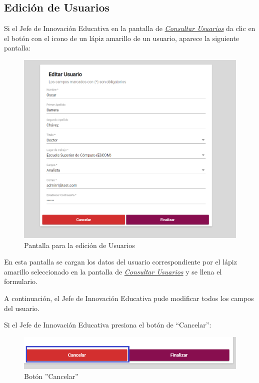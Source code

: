 \newpage

\hypertarget{editar-user}{}
\subsection{Edición de Usuarios}
Si el Jefe de Innovación Educativa en la pantalla de \hyperlink{consultarUs}{\textit{Consultar Usuarios}} da clic en el botón con el icono de un lápiz amarillo de un usuario, aparece la siguiente pantalla:

\begin{figure}[H]
	\centering
	\hypertarget{editarUs}{\includegraphics[width=0.6\linewidth]{images/SP5/Editar-Usuario}}
	\caption{Pantalla para la edición de Usuarios}
	\label{editarrh}
\end{figure}

En esta pantalla se cargan los datos del usuario correspondiente por el lápiz amarillo seleccionado en la pantalla de \hyperlink{consultarUs}{\textit{Consultar Usuarios}} y se llena el formulario.

A continuación, el Jefe de Innovación Educativa pude modificar todos los campos del usuario.

Si el Jefe de Innovación Educativa presiona el botón de “Cancelar”:

\begin{figure}[H]
	\centering
	\hypertarget{cancel2}{\includegraphics[width=0.7\linewidth]{images/SP5/BtnCancelar2}}
	\caption{Botón ''Cancelar''}
	\label{cancel2}
\end{figure}

